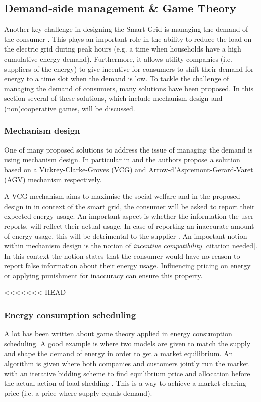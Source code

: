\subsection{Demand-side management \& Game Theory}
Another key challenge in designing the Smart Grid is managing the demand of the consumer \cite{keypaper}. This plays an important role in the ability to reduce the load on the electric grid during peak hours (e.g. a time when households have a high cumulative energy demand). Furthermore, it allows utility companies (i.e. suppliers of the energy) to give incentive for consumers to shift their demand for energy to a time slot when the demand is low.  To tackle the challenge of managing the demand of consumers, many solutions have been proposed. In this section several of these solutions, which include mechanism design and (non)cooperative games, will be discussed. 

\subsubsection{Mechanism design}
One of many proposed solutions to address the issue of managing the demand is using mechanism design. In particular in \cite{SamadiMohsenian-RadSchoberEtAl2012} and \cite{MaDengSongEtAl2014} the authors propose a solution based on a Vickrey-Clarke-Groves (VCG) and Arrow-d'Aspremont-Gerard-Varet (AGV) mechanism respectively.

A VCG mechanism aims to maximise the social welfare \cite{ShohamLeyton-Brown2008} and in the proposed design in \cite{SamadiMohsenian-RadSchoberEtAl2012} in context of the smart grid, the consumer will be asked to report their expected energy usage. An important aspect is whether the information the user reports, will reflect their actual usage. In case of reporting an inaccurate amount of energy usage, this will be detrimental to the supplier \cite{MaDengSongEtAl2014}. An important notion within mechanism design is the notion of \textit{incentive compatibility} [citation needed]. In this context the notion states that the consumer would have no reason to report false information about their energy usage. Influencing pricing on energy \cite{SamadiMohsenian-RadSchoberEtAl2012} or applying punishment for inaccuracy \cite{MaDengSongEtAl2014} can ensure this property.

<<<<<<< HEAD
\subsubsection{Energy consumption scheduling}
A lot has been written about game theory applied in energy consumption scheduling. A good example is \cite{ChenLiLowEtAl2010} where two models are given to match the supply and shape the demand of energy in order to get a market equilibrium. An algorithm is given where both companies and customers jointly run the market with an iterative bidding scheme to find equilibrium price and allocation before the actual action of load shedding \cite{ChenLiLowEtAl2010}. This is a way to achieve a market-clearing price (i.e. a price where supply equals demand).


